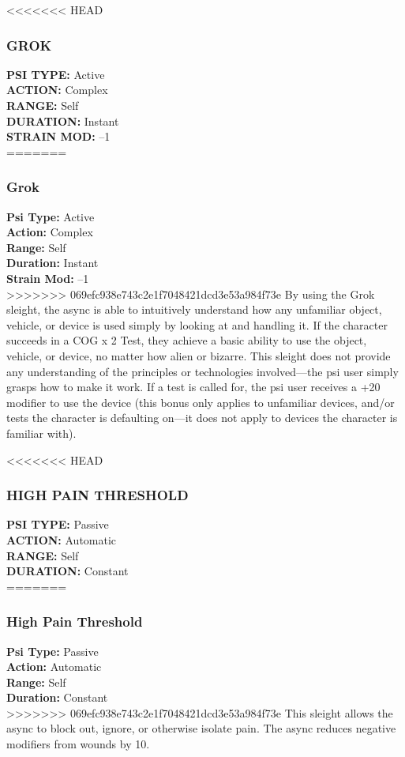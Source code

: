 <<<<<<< HEAD \subsubsection{GROK} \textbf{PSI TYPE:} Active \\ \textbf{ACTION:} Complex \\ \textbf{RANGE:} Self \\ \textbf{DURATION:} Instant \\ \textbf{STRAIN MOD:} –1 \\ ======= \subsubsection{Grok} \textbf{Psi Type:} Active \\ \textbf{Action:} Complex \\ \textbf{Range:} Self \\ \textbf{Duration:} Instant \\ \textbf{Strain Mod:} –1 \\ >>>>>>> 069efc938e743c2e1f7048421dcd3e53a984f73e By using the Grok sleight, the async is able to intuitively understand how any unfamiliar object, vehicle, or device is used simply by looking at and handling it. If the character succeeds in a COG x 2 Test, they achieve a basic ability to use the object, vehicle, or device, no matter how alien or bizarre. This sleight does not provide any understanding of the principles or technologies involved—the psi user simply grasps how to make it work. If a test is called for, the psi user receives a +20 modifier to use the device (this bonus only applies to unfamiliar devices, and/or tests the character is defaulting on—it does not apply to devices the character is familiar with). 

<<<<<<< HEAD \subsubsection{HIGH PAIN THRESHOLD} \textbf{PSI TYPE:} Passive \\ \textbf{ACTION:} Automatic \\ \textbf{RANGE:} Self \\ \textbf{DURATION:} Constant \\ ======= \subsubsection{High Pain Threshold} \textbf{Psi Type:} Passive \\ \textbf{Action:} Automatic \\ \textbf{Range:} Self \\ \textbf{Duration:} Constant \\ >>>>>>> 069efc938e743c2e1f7048421dcd3e53a984f73e This sleight allows the async to block out, ignore, or otherwise isolate pain. The async reduces negative modifiers from wounds by 10. 

